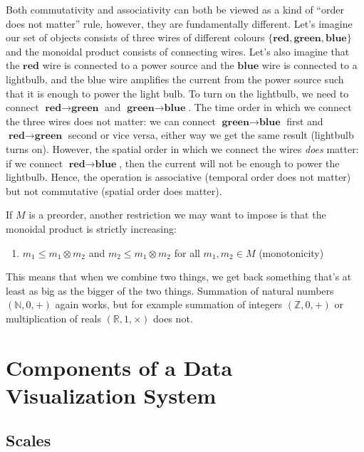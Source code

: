 \documentclass[
]{book}
\providecommand{\tightlist}{%
  \setlength{\itemsep}{0pt}\setlength{\parskip}{0pt}}
\theoremstyle{definition}
\theoremstyle{definition}
\theoremstyle{definition}
\theoremstyle{definition}
\theoremstyle{remark}
\begin{document}
Both commutativity and associativity can both be viewed as a kind of ``order does not matter'' rule, however, they are fundamentally different. Let's imagine our set of objects consists of three wires of different colours \(\{ \textbf{red}, \textbf{green}, \textbf{blue} \}\) and the monoidal product consists of connecting wires. Let's also imagine that the \(\textbf{red}\) wire is connected to a power source and the \(\textbf{blue}\) wire is connected to a lightbulb, and the blue wire amplifies the current from the power source such that it is enough to power the light bulb. To turn on the lightbulb, we need to connect \(\textbf{red} \to \textbf{green}\) and \(\textbf{green} \to \textbf{blue}\). The time order in which we connect the three wires does not matter: we can connect \(\textbf{green} \to \textbf{blue}\) first and \(\textbf{red} \to \textbf{green}\) second or vice versa, either way we get the same result (lightbulb turns on). However, the spatial order in which we connect the wires \emph{does} matter: if we connect \(\textbf{red} \to \textbf{blue}\), then the current will not be enough to power the lightbulb. Hence, the operation is associative (temporal order does not matter) but not commutative (spatial order does matter).

If \(M\) is a preorder, another restriction we may want to impose is that the monoidal product is strictly increasing:

\begin{enumerate}
\def\labelenumi{\arabic{enumi}.}
\setcounter{enumi}{3}
\tightlist
\item
  \(m_1 \leq m_1 \otimes m_2\) and \(m_2 \leq m_1 \otimes m_2\) for all \(m_1, m_2 \in M\) (monotonicity)
\end{enumerate}

This means that when we combine two things, we get back something that's at least as big as the bigger of the two things. Summation of natural numbers \((\mathbb{N}, 0, +)\) again works, but for example summation of integers \((\mathbb{Z}, 0, +)\) or multiplication of reals \((\mathbb{R}, 1, \times)\) does not.

\section{Components of a Data Visualization System}\label{components-of-a-data-visualization-system}

\subsection{Scales}\label{scales}
\end{document}
